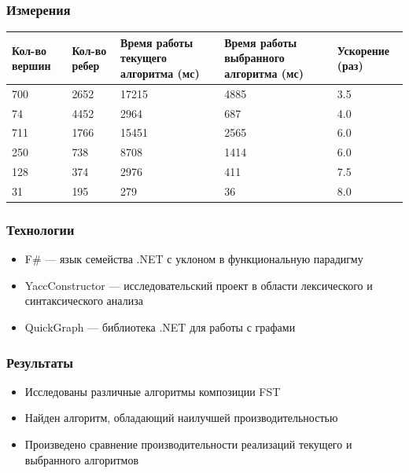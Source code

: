 \documentclass{beamer}
\begin{document}
\begin{frame}
  \transwipe[direction=90]
  \frametitle{Измерения}
    \begin{center}
        \begin{tabular}{ | p{1.5cm} | p{1.5cm} | p{2.4cm} | p{2.6cm} | p{1.7cm} | }
        \hline
        Кол-во вершин & Кол-во ребер & 
        Время работы текущего алгоритма (мс) & 
        Время работы выбранного алгоритма (мс) & Ускорение (раз) \\ \hline
        700 & 2652 & 17215 & 4885 & 3.5 \\ \hline
        74 & 4452 & 2964 & 687 & 4.0 \\ \hline
        711 & 1766 & 15451 & 2565 & 6.0 \\ \hline
        250 & 738 & 8708 & 1414 & 6.0 \\ \hline
        128 & 374 & 2976 & 411 & 7.5 \\ \hline
        31 & 195 & 279 & 36 & 8.0 \\ \hline
        \end{tabular}
    \end{center}
\end{frame}

\begin{frame}
  \transwipe[direction=90]
  \frametitle{Технологии}
  \begin{itemize}
    \item F\# — язык семейства .NET с уклоном в функциональную парадигму
    \item YaccConstructor — исследовательский проект в области лексического и синтаксического анализа
    \item QuickGraph — библиотека .NET для работы с графами
  \end{itemize}
\end{frame}

\begin{frame}
  \transwipe[direction=90]
  \frametitle{Результаты}
  \begin{itemize}
    \item Исследованы различные алгоритмы композиции FST
    \item Найден алгоритм, обладающий наилучшей производительностью
    \item Произведено сравнение производительности реализаций текущего и выбранного алгоритмов
  \end{itemize}
\end{frame}
\end{document}
